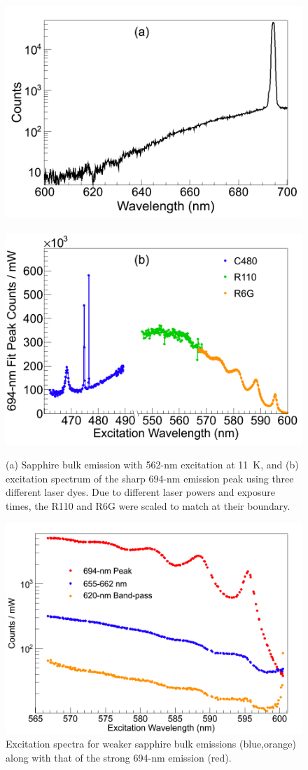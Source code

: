 \begin{figure} %
        \centering
                \includegraphics[width=.5\textwidth]{figures/Cr_a.png}
                ~
                \includegraphics[width=.5\textwidth]{figures/Cr_b.png}
                \caption{(a) Sapphire bulk emission with 562-nm excitation at 11~K, and (b) excitation spectrum of the sharp 694-nm emission peak using three different laser dyes.  Due to different laser powers and exposure times, the R110 and R6G were scaled to match at their boundary.}
\label{fig:Cr}
\end{figure}

\begin{figure} %
        \centering
                \includegraphics[width=.7\textwidth]{figures/Cr_broad.png}
                \caption{Excitation spectra for weaker sapphire bulk emissions (blue,orange) along with that of the strong 694-nm emission (red).}
        \label{fig:CrBroad}
\end{figure}

